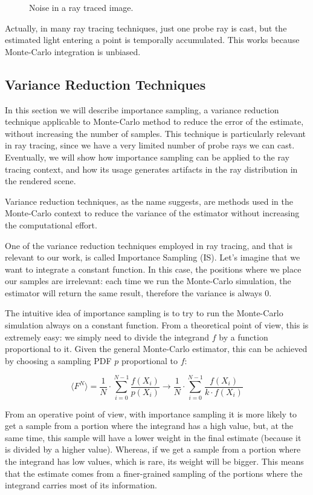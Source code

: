 \documentclass{PoliMi_MasterThesis}
\begin{document}
\begin{figure}[H]
{    }
	\caption{Noise in a ray traced image.}
    \label{fig:noise_example}
\end{figure}

Actually, in many ray tracing techniques, just one probe ray is cast, but the estimated light entering a point is temporally accumulated. This works because Monte-Carlo integration is unbiased.

\subsection{Variance Reduction Techniques}
In this section we will describe importance sampling, a variance reduction technique applicable to Monte-Carlo method to reduce the error of the estimate, without increasing the number of samples. This technique is particularly relevant in ray tracing, since we have a very limited number of probe rays we can cast. Eventually, we will show how importance sampling can be applied to the ray tracing context, and how its usage generates artifacts in the ray distribution in the rendered scene.

Variance reduction techniques, as the name suggests, are methods used in the Monte-Carlo context to reduce the variance of the estimator without increasing the computational effort.

One of the variance reduction techniques employed in ray tracing, and that is relevant to our work, is called Importance Sampling (IS). Let's imagine that we want to integrate a constant function. In this case, the positions where we place our samples are irrelevant: each time we run the Monte-Carlo simulation, the estimator will return the same result, therefore the variance is always 0.

The intuitive idea of importance sampling is to try to run the Monte-Carlo simulation always on a constant function. From a theoretical point of view, this is extremely easy: we simply need to divide the integrand $\textit{f}$ by a function proportional to it. Given the general Monte-Carlo estimator, this can be achieved by choosing a sampling PDF $p$ proportional to $\textit{f}$:

$$\langle F^N \rangle = \frac{1}{N}\cdot\sum_{i=0}^{N-1}\frac{\textit{f}(X_i)}{p(X_i)} \longrightarrow \frac{1}{N}\cdot\sum_{i=0}^{N-1}\frac{\textit{f}(X_i)}{k\cdot \textit{f}(X_i)}$$

From an operative point of view, with importance sampling it is more likely to get a sample from a portion where the integrand has a high value, but, at the same time, this sample will have a lower weight in the final estimate (because it is divided by a higher value). Whereas, if we get a sample from a portion where the integrand has low values, which is rare, its weight will be bigger. This means that the estimate comes from a finer-grained sampling of the portions where the integrand carries most of its information.
\end{document}
